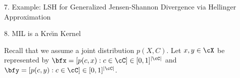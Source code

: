\documentclass[final]{beamer}
\newcommand{\kr}{Kre\u{\i}n\xspace}
\DeclareMathOperator{\hel}{hel}
\newlength{\threecolwid}
\begin{document}
\begin{frame}[t]
\begin{columns}[t]
\begin{column}{\threecolwid}
\begin{block}{7. Example: LSH for Generalized Jensen-Shannon 
			Divergence via Hellinger Approximation}
%		
		
	\end{block}
	\begin{block}{8. MIL is a \kr Kernel}
 		
 		
 		
 		Recall that we assume a joint distribution $ 
 		p(X,C) $.
 		Let $ x,y\in \cX $ be represented 
 		by 
 		$\bfx=[p(c,x):c\in \cC]\in 
 		[0,1]^{|\cC|}$ and $ \bfy=[p(c,y):c\in 
 		\cC]\in 
 		[0,1]^{|\cC|}$.
 		

\end{block}
\end{column}
\end{columns}
\end{frame}
\end{document}
